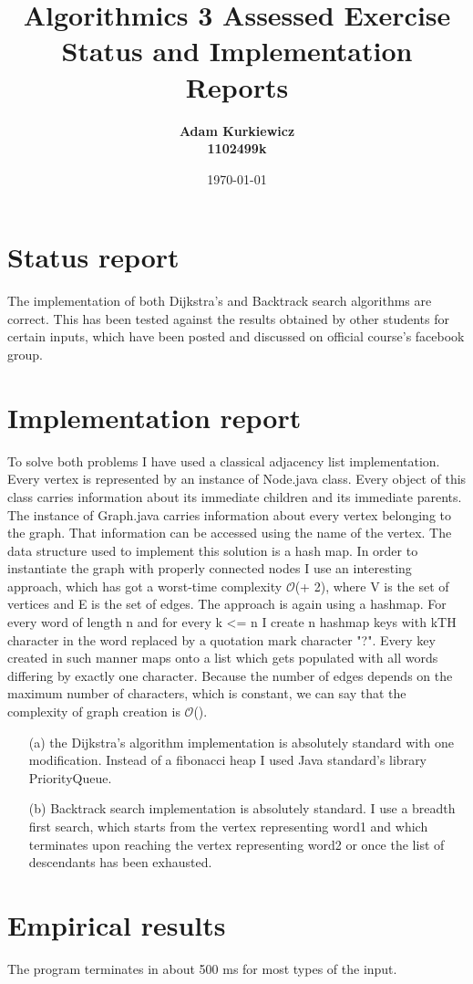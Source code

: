 \documentclass{article}
\title{Algorithmics 3 Assessed Exercise\\ \vspace{4mm} 
Status and Implementation Reports}
\author{\bf Adam Kurkiewicz\\ \bf 1102499k}
\date{\today}
\newcommand{\bigO}{\ensuremath{\mathcal{O}}}
\begin{document}
\maketitle

\section*{Status report}

The implementation of both Dijkstra's and Backtrack search algorithms are correct. This has been tested against the results obtained by other students for certain inputs, which have been posted and discussed on official course's facebook group.

\section*{Implementation report}

To solve both problems I have used a classical adjacency list implementation. Every vertex is represented by an instance of Node.java class. Every object of this class carries information about its immediate children and its immediate parents. The instance of Graph.java carries information about every vertex belonging to the graph. That information can be accessed using the name of the vertex. The data structure used to implement this solution is a hash map. In order to instantiate the graph with properly connected nodes I use an interesting approach, which has got a worst-time complexity \bigO{(\left{}\right\vert + \left{}\right\vert\uppercase{2})}, where V is the set of vertices and E is the set of edges. The approach is again using a hashmap. For every word of length n and for every k <= n I create n hashmap keys with k\uppercase{th} character in the word replaced by a quotation mark character "?". Every key created in such manner maps onto a list which gets populated with all words differing by exactly one character. Because the number of edges depends on the maximum number of characters, which is constant, we can say that the complexity of graph creation is \bigO{(\left{}\right\vert)}. 

\begin{itemize}
\item[(a)] 
the Dijkstra's algorithm implementation is absolutely standard with one modification. Instead of a fibonacci heap I used Java standard's library PriorityQueue.
\item[(b)]
Backtrack search implementation is absolutely standard. I use a breadth first search, which starts from the vertex representing word1 and which terminates upon reaching the vertex representing word2 or once the list of descendants has been exhausted.
\end{itemize}

\section*{Empirical results}

The program terminates in about 500 ms for most types of the input. 
\end{document}
